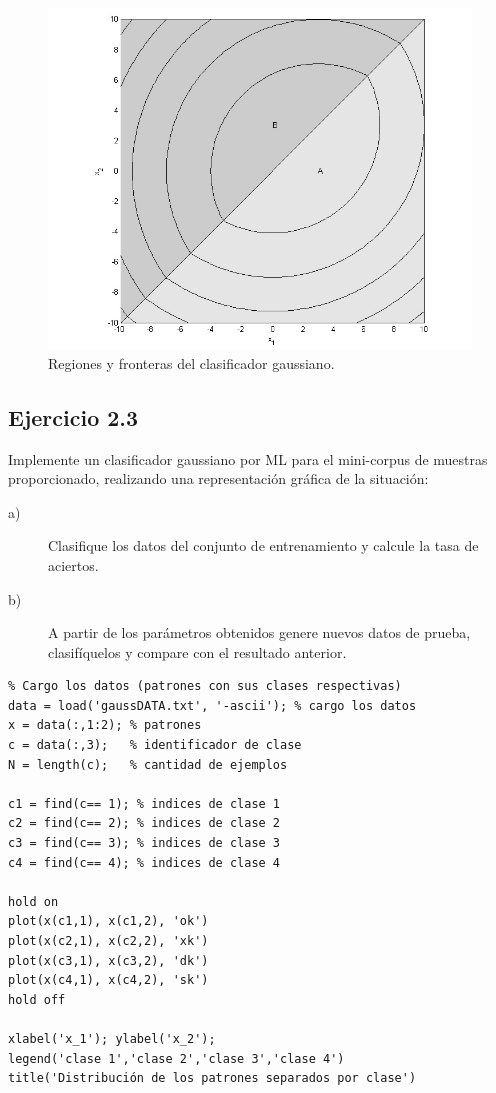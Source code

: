 \documentclass[11pt,a4paper,final]{article}
\begin{document}
\begin{figure}[h]
	\centering
	\includegraphics[scale= .5]{ejercicio22}
	\caption{Regiones y fronteras del clasificador gaussiano.}
	\label{ejercicio22}
\end{figure}


\clearpage


\subsection{Ejercicio 2.3}

Implemente un clasificador gaussiano por ML para el mini-corpus de muestras proporcionado, realizando una representación gráfica de la situación:

\begin{description}
\item[a)] Clasifique los datos del conjunto de entrenamiento y calcule la tasa de aciertos.

\item[b)] A partir de los parámetros obtenidos genere nuevos datos de prueba, clasifíquelos y compare con el resultado anterior.
\end{description}

\begin{verbatim}
% Cargo los datos (patrones con sus clases respectivas)
data = load('gaussDATA.txt', '-ascii'); % cargo los datos
x = data(:,1:2); % patrones
c = data(:,3);   % identificador de clase
N = length(c);   % cantidad de ejemplos

c1 = find(c== 1); % indices de clase 1
c2 = find(c== 2); % indices de clase 2
c3 = find(c== 3); % indices de clase 3
c4 = find(c== 4); % indices de clase 4

hold on
plot(x(c1,1), x(c1,2), 'ok')
plot(x(c2,1), x(c2,2), 'xk')
plot(x(c3,1), x(c3,2), 'dk')
plot(x(c4,1), x(c4,2), 'sk')
hold off

xlabel('x_1'); ylabel('x_2');
legend('clase 1','clase 2','clase 3','clase 4')
title('Distribución de los patrones separados por clase')
\end{verbatim}
\end{document}
